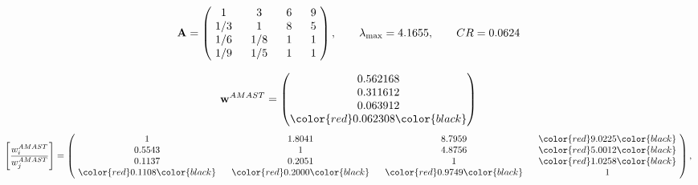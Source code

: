 \begin{example}
\begin{equation*}
\mathbf{A} =
\begin{pmatrix}
$\,\,$ 1 $\,\,$ & $\,\,$3$\,\,$ & $\,\,$6$\,\,$ & $\,\,$9 $\,\,$ \\
$\,\,$ 1/3$\,\,$ & $\,\,$ 1 $\,\,$ & $\,\,$8$\,\,$ & $\,\,$5 $\,\,$ \\
$\,\,$ 1/6$\,\,$ & $\,\,$ 1/8$\,\,$ & $\,\,$ 1 $\,\,$ & $\,\,$1 $\,\,$ \\
$\,\,$ 1/9$\,\,$ & $\,\,$ 1/5$\,\,$ & $\,\,$ 1 $\,\,$ & $\,\,$ 1  $\,\,$ \\
\end{pmatrix},
\qquad
\lambda_{\max} =
4.1655,
\qquad
CR = 0.0624
\end{equation*}

\begin{equation*}
\mathbf{w}^{AMAST} =
\begin{pmatrix}
0.562168\\
0.311612\\
0.063912\\
\color{red} 0.062308\color{black}
\end{pmatrix}\end{equation*}
\begin{equation*}
\left[ \frac{{w}^{AMAST}_i}{{w}^{AMAST}_j} \right] =
\begin{pmatrix}
$\,\,$ 1 $\,\,$ & $\,\,$1.8041$\,\,$ & $\,\,$8.7959$\,\,$ & $\,\,$\color{red} 9.0225\color{black} $\,\,$ \\
$\,\,$0.5543$\,\,$ & $\,\,$ 1 $\,\,$ & $\,\,$4.8756$\,\,$ & $\,\,$\color{red} 5.0012\color{black}   $\,\,$ \\
$\,\,$0.1137$\,\,$ & $\,\,$0.2051$\,\,$ & $\,\,$ 1 $\,\,$ & $\,\,$\color{red} 1.0258\color{black}  $\,\,$ \\
$\,\,$\color{red} 0.1108\color{black} $\,\,$ & $\,\,$\color{red} 0.2000\color{black} $\,\,$ & $\,\,$\color{red} 0.9749\color{black} $\,\,$ & $\,\,$ 1  $\,\,$ \\
\end{pmatrix},
\end{equation*}


\end{example}
